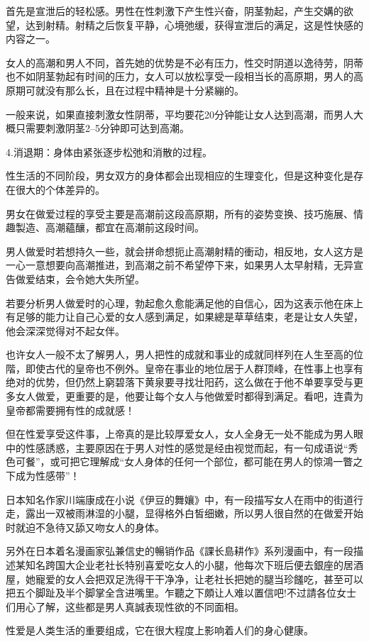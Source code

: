 \documentclass[12pt,UTF8]{ctexbook}
\begin{document}
首先是宣泄后的轻松感。男性在性刺激下产生性兴奋，阴茎勃起，产生交媾的欲望，达到射精。射精之后恢复平静，心境弛缓，获得宣泄后的满足，这是性快感的内容之一。

女人的高潮和男人不同，首先她的优势是不必有压力，性交时阴道以逸待劳，阴蒂也不如阴茎勃起有时间的压力，女人可以放松享受一段相当长的高原期，男人的高原期可就没有那么长，且在过程中精神是十分紧繃的。

一般来说，如果直接刺激女性阴蒂，平均要花20分钟能让女人达到高潮，而男人大概只需要刺激阴茎2--5分钟即可达到高潮。

4.消退期：身体由紧张逐步松弛和消散的过程。

性生活的不同阶段，男女双方的身体都会出现相应的生理变化，但是这种变化是存在很大的个体差异的。

男女在做爱过程的享受主要是高潮前这段高原期，所有的姿势变换、技巧施展、情趣製造、高潮蘊釀，都宜在高潮前这段时间。

男人做爱时若想持久一些，就会拼命想扼止高潮射精的衝动，相反地，女人这方是一心一意想要向高潮推进，到高潮之前不希望停下来，如果男人太早射精，无异宣告做爱结束，会令她大失所望。

若要分析男人做爱时的心理，勃起愈久愈能满足他的自信心，因为这表示他在床上有足够的能力让自己心爱的女人感到满足，如果總是草草结束，老是让女人失望，他会深深觉得对不起女伴。

也许女人一般不太了解男人，男人把性的成就和事业的成就同样列在人生至高的位階，即使古代的皇帝也不例外。皇帝在事业的地位居于人群顶峰，在性事上也享有绝对的优势，但仍然上窮碧落下黄泉要寻找壮阳药，这么做在于他不单要享受与更多女人做爱，更重要的是，他要让每个女人与他做爱时都得到满足。看吧，连貴为皇帝都需要拥有性的成就感！

但在性爱享受这件事，上帝真的是比较厚爱女人，女人全身无一处不能成为男人眼中的性感誘惑，主要原因在于男人对性的感觉是经由视觉而起，有一句成语说“秀色可餐”，或可把它理解成“女人身体的任何一个部位，都可能在男人的惊鴻一瞥之下成为性感带”！

日本知名作家川端康成在小说《伊豆的舞孃》中，有一段描写女人在雨中的街道行走，露出一双被雨淋湿的小腿，显得格外白皙细嫩，所以男人很自然的在做爱开始时就迫不急待又舔又吻女人的身体。

另外在日本着名漫画家弘兼信史的暢销作品《課长島耕作》系列漫画中，有一段描述某知名跨国大企业老社长特别喜爱吃女人的小腿，他每次下班后便去銀座的居酒屋，她寵爱的女人会把双足洗得干干净净，让老社长把她的腿当珍饈吃，甚至可以把五个脚趾及半个脚掌全含进嘴里。乍聽之下頗让人难以置信吧!不过請各位女士们用心了解，这些都是男人真誠表现性欲的不同面相。

性爱是人类生活的重要组成，它在很大程度上影响着人们的身心健康。
\end{document}
